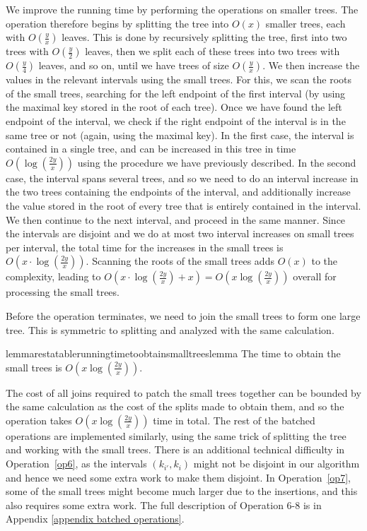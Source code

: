 \documentclass[a4paper,UKenglish]{lipics-v2016}
\theoremstyle{plain}
\begin{document}
We improve the running time by performing the operations on smaller trees. The operation therefore begins by splitting the tree into $O(x)$ smaller trees, each with $O(\frac{y}{x})$ leaves. This is done by recursively splitting the tree, first into two trees with $O(\frac{y}{2})$ leaves, then we split each of these trees into two trees with $O(\frac{y}{4})$ leaves, and so on, until we have trees of size $O(\frac{y}{x})$. We then increase the values in the relevant intervals using the small trees. For this, we scan the roots of the small trees, searching for the left endpoint of the first interval (by using the maximal key stored in the root of each tree). Once we have found the left endpoint of the interval, we check if the right endpoint of the interval is in the same tree or not (again, using the maximal key). In the first case, the interval is contained in a single tree, and can be increased in this tree in time $O(\log(\frac{2y}{x}))$ using the procedure we have previously described. In the second case, the interval spans several trees, and so we need to do an interval increase in the two trees containing the endpoints of the interval, and additionally increase the value stored in the root of every tree that is entirely contained in the interval. We then continue to the next interval, and proceed in the same manner. 
%
Since the intervals are disjoint and we do at most two interval increases on small trees per interval, the total time for the increases in the small trees is $O(x \cdot \log (\frac{2y}{x}))$. Scanning the roots of the small trees adds $O(x)$ to the complexity, leading to 
 $O(x \cdot \log (\frac{2y}{x}) + x) = O(x \log (\frac{2y}{x}))$ overall for processing the small trees.

Before the operation terminates, we need to join the small trees to form one large tree. This is symmetric to splitting and analyzed with the same
calculation.
\begin{restatable}{lemmarestatable}{runningtimetoobtainsmalltreeslemma}
\label{running time to obtain small trees lemma}
The time to obtain the small trees is $O(x \log (\frac{2y}{x}))$.
\end{restatable}

The cost of all joins required to patch the small trees together can be bounded by the same calculation as the cost of the splits made to obtain them, and so the operation takes $O(x \log (\frac{2y}{x}))$ time in total.
The rest of the batched operations are implemented similarly, using the same trick of splitting the tree and working with the small trees. 
There is an additional technical difficulty in Operation~\ref{op6}, as the intervals $(k_{i'},k_{i})$ might not be disjoint in our algorithm and
hence we need some extra work to make them disjoint. 
In Operation~\ref{op7}, some of the small trees might become much larger due to the insertions, and this also requires some extra work.
The full description of Operation 6-8 is in Appendix \ref{appendix batched operations}.
\end{document}
